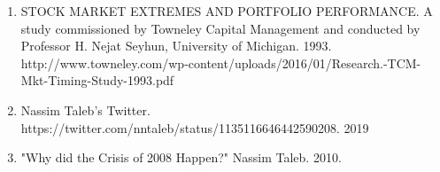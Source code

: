 \documentclass[11pt]{article}
\providecommand{\tightlist}{%
      \setlength{\itemsep}{0pt}\setlength{\parskip}{0pt}}
\begin{document}
    \begin{enumerate}
\def\labelenumi{\arabic{enumi}.}
\tightlist
\item
  STOCK MARKET EXTREMES AND PORTFOLIO PERFORMANCE. A study commissioned
  by Towneley Capital Management and conducted by Professor H. Nejat
  Seyhun, University of Michigan. 1993.
  http://www.towneley.com/wp-content/uploads/2016/01/Research.-TCM-Mkt-Timing-Study-1993.pdf
\item
  Nassim Taleb's Twitter.
  https://twitter.com/nntaleb/status/1135116646442590208. 2019
\item
  "Why did the Crisis of 2008 Happen?" Nassim Taleb. 2010.
\end{enumerate}


    
    
    
    
\end{document}
